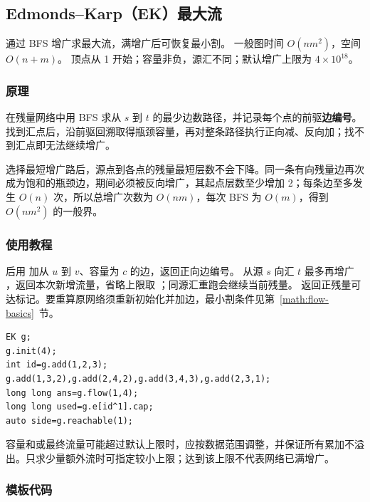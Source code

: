 \subsection{Edmonds--Karp（EK）最大流}
\label{algo:ek}
\AlgorithmInfo
    {通过 BFS 增广求最大流，满增广后可恢复最小割。}
    {一般图时间 $O(nm^2)$，空间 $O(n+m)$。}
    {顶点从 1 开始；容量非负，源汇不同；默认增广上限为 $4\times10^{18}$。}

\subsubsection*{原理}
在残量网络中用 BFS 求从 $s$ 到 $t$ 的最少边数路径，并记录每个点的前驱\textbf{边编号}。找到汇点后，沿前驱回溯取得瓶颈容量，再对整条路径执行正向减、反向加；找不到汇点即无法继续增广。

选择最短增广路后，源点到各点的残量最短层数不会下降。同一条有向残量边再次成为饱和的瓶颈边，期间必须被反向增广，其起点层数至少增加 2；每条边至多发生 $O(n)$ 次，所以总增广次数为 $O(nm)$，每次 BFS 为 $O(m)$，得到 $O(nm^2)$ 的一般界。

\subsubsection*{使用教程}
 后用  加从 $u$ 到 $v$、容量为 $c$ 的边，返回正向边编号。 从源 $s$ 向汇 $t$ 最多再增广 ，返回本次新增流量，省略上限取 ；同源汇重跑会继续当前残量。 返回正残量可达标记。要重算原网络须重新初始化并加边，最小割条件见第~\ref{math:flow-basics}~节。
\begin{lstlisting}[style=mtycpp,numbers=none]
EK g;
g.init(4);
int id=g.add(1,2,3);
g.add(1,3,2),g.add(2,4,2),g.add(3,4,3),g.add(2,3,1);
long long ans=g.flow(1,4);
long long used=g.e[id^1].cap;
auto side=g.reachable(1);
\end{lstlisting}
容量和或最终流量可能超过默认上限时，应按数据范围调整，并保证所有累加不溢出。只求少量额外流时可指定较小上限；达到该上限不代表网络已满增广。

\subsubsection*{模板代码}
